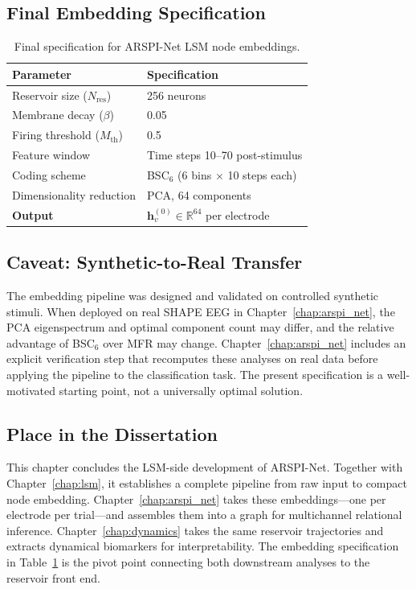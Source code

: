 \subsection{Final Embedding Specification}

\begin{table}[H]
    \centering
    \caption{Final specification for ARSPI-Net LSM node embeddings.}
    \label{tab:final_embedding_spec}
    \renewcommand{\arraystretch}{1.2}
    \begin{tabular}{|l|p{8cm}|}
        \hline
        \textbf{Parameter} & \textbf{Specification} \\
        \hline
        Reservoir size ($N_{\text{res}}$) & 256 neurons \\
        Membrane decay ($\beta$) & 0.05 \\
        Firing threshold ($M_{\text{th}}$) & 0.5 \\
        Feature window & Time steps 10--70 post-stimulus \\
        Coding scheme & BSC$_6$ (6 bins $\times$ 10 steps each) \\
        Dimensionality reduction & PCA, 64 components \\
        \textbf{Output} & $\mathbf{h}_v^{(0)} \in \mathbb{R}^{64}$ per electrode \\
        \hline
    \end{tabular}
\end{table}

\subsection{Caveat: Synthetic-to-Real Transfer}

The embedding pipeline was designed and validated on controlled synthetic stimuli. When deployed on real SHAPE EEG in Chapter~\ref{chap:arspi_net}, the PCA eigenspectrum and optimal component count may differ, and the relative advantage of BSC$_6$ over MFR may change. Chapter~\ref{chap:arspi_net} includes an explicit verification step that recomputes these analyses on real data before applying the pipeline to the classification task. The present specification is a well-motivated starting point, not a universally optimal solution.

\subsection{Place in the Dissertation}

This chapter concludes the LSM-side development of ARSPI-Net. Together with Chapter~\ref{chap:lsm}, it establishes a complete pipeline from raw input to compact node embedding. Chapter~\ref{chap:arspi_net} takes these embeddings---one per electrode per trial---and assembles them into a graph for multichannel relational inference. Chapter~\ref{chap:dynamics} takes the same reservoir trajectories and extracts dynamical biomarkers for interpretability. The embedding specification in Table~\ref{tab:final_embedding_spec} is the pivot point connecting both downstream analyses to the reservoir front end.
